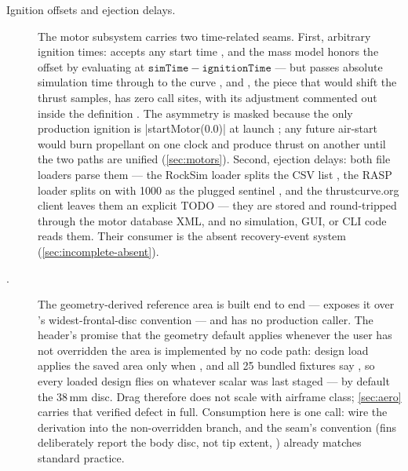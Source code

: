 \begin{description}
\item[Ignition offsets and ejection delays.] The motor subsystem carries two time-related
seams. First, arbitrary ignition times: 
accepts any start time , and the mass model honors the offset
by evaluating at $\mathtt{simTime} - \mathtt{ignitionTime}$ 
--- but  passes absolute simulation time through to the curve
, and , the piece that
would shift the thrust samples, has zero call sites, with its  adjustment
commented out inside the definition . The asymmetry is
masked because the only production ignition is \cppinline|startMotor(0.0)| at launch
; any future air-start would burn propellant on one clock
and produce thrust on another until the two paths are unified (\cref{sec:motors}). Second,
ejection delays: both file loaders parse them --- the RockSim loader splits the CSV list
, the RASP loader splits on \code{-} with 1000 as the
plugged sentinel , and the thrustcurve.org client leaves them
an explicit TODO  --- they are stored
 and round-tripped through the motor database XML, and no
simulation, GUI, or CLI code reads them. Their consumer is the absent recovery-event system
(\cref{sec:incomplete-absent}).

\item[.] The geometry-derived reference area is
built end to end ---  exposes it  over
's widest-frontal-disc convention
 --- and has no production caller. The header's promise that
the geometry default applies whenever the user has not overridden the area
 is implemented by no code path: design load applies the saved
area only when  ,
and all 25 bundled fixtures say , so every loaded design flies on whatever
scalar was last staged --- by default the 38\,mm disc. Drag therefore does not scale with
airframe class; \cref{sec:aero} carries that verified defect in full. Consumption here is
one call: wire the derivation into the non-overridden branch, and the seam's convention
(fins deliberately report the body disc, not tip extent, )
already matches standard practice.


\end{description}
